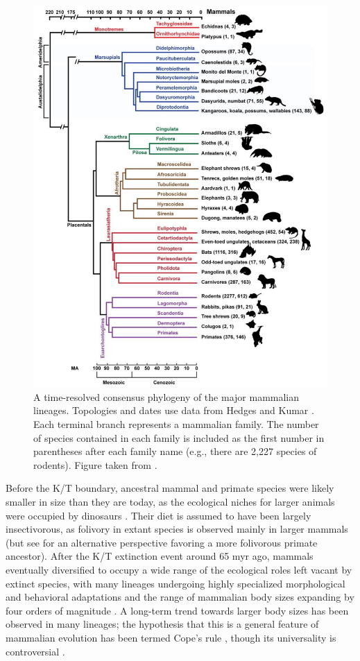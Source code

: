 \begin{figure}
\centering
\includegraphics[scale=0.5]{Figs/mammals_10k.pdf}
\caption{A time-resolved consensus phylogeny of the major mammalian
  lineages. Topologies and dates use data from Hedges and Kumar
  \citeyearpar{Hedges2009}. Each terminal branch represents a
  mammalian family. The number of species contained in each family is
  included as the first number in parentheses after each family name
  (e.g., there are 2,227 species of rodents). Figure taken from
  \citet{Haussler2009}. }
\label{fig_mammals_10k}
\end{figure}

Before the K/T boundary, ancestral mammal and primate species were
likely smaller in size than they are today, as the ecological niches
for larger animals were occupied by dinosaurs
\citep{Martin2007,Smith2010}. Their diet is assumed to have been
largely insectivorous, as folivory in extant species is observed
mainly in larger mammals \citep{Smith2010} (but see \citet{Martin2007}
for an alternative perspective favoring a more folivorous primate
ancestor). After the K/T extinction event around 65 \ac{myr} ago,
mammals eventually diversified to occupy a wide range of the
ecological roles left vacant by extinct species, with many lineages
undergoing highly specialized morphological and behavioral adaptations
and the range of mammalian body sizes expanding by four orders of
magnitude \citep{Alroy1998}. A long-term trend towards larger body
sizes has been observed in many lineages; the hypothesis that this is
a general feature of mammalian evolution has been termed Cope's rule
\citep{Alroy1998}, though its universality is controversial
\citep{Finarelli2006,Monroe2010}.

